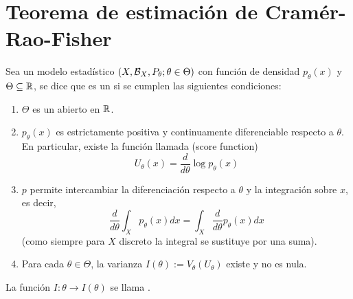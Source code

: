 \section{Teorema de estimación de Cramér-Rao-Fisher}

\begin{definicion}
    Sea un modelo estadístico $(X, \mathcal{B}_{X}, P_{\theta}; \theta \in \Theta)$ con función de densidad $p_{\theta}(x)$ y $\Theta\subseteq \mathbb{R}$, se dice que es un  si se cumplen las siguientes condiciones:
    \begin{enumerate}[label=(\arabic*)]
        \item $\Theta$ es un abierto en $\mathbb{R}$.
        \item $p_{\theta}(x)$ es estrictamente positiva y continuamente diferenciable respecto a $\theta$. En particular, existe la función llamada  (score function)
        \begin{equation*}
            U_{\theta}(x) = \dfrac{d}{d\theta} \log p_{\theta}(x)
        \end{equation*}
        \item $p$ permite intercambiar la diferenciación respecto a $\theta$ y la integración sobre $x$, es decir,
        \begin{equation*}
            \dfrac{d}{d\theta} \int_{X} p_{\theta}(x) dx = \int_{X} \dfrac{d}{d\theta} p_{\theta}(x) dx
        \end{equation*}
        (como siempre para $X$ discreto la integral se sustituye por una suma).
        \item Para cada $\theta \in \Theta$, la varianza $I(\theta) := V_{\theta} \left( U_{\theta} \right)$ existe y no es nula.
    \end{enumerate}
    La función $I:\theta\to I(\theta)$ se llama .
\end{definicion}

